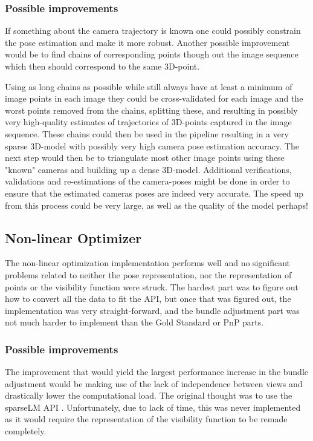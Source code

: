 \subsubsection{Possible improvements}
If something about the camera trajectory is known one could possibly constrain the pose estimation and make it more robust.
Another possible improvement would be to find chains of corresponding points though out the image sequence which then should correspond to the same 3D-point. 
\newpage

Using as long chains as possible while still always have at least a minimum of image points in each image they could be cross-validated for each image and the worst points removed from the chains, splitting these, and resulting in possibly very high-quality estimates of trajectories of 3D-points captured in the image sequence. These chains could then be used in the pipeline resulting in a very sparse 3D-model with possibly very high camera pose estimation accuracy. The next step would then be to triangulate most other image points using these "known" cameras and building up a dense 3D-model. Additional verifications, validations and re-estimations of the camera-poses might be done in order to ensure that the estimated cameras poses are indeed very accurate. The speed up from this process could be very large, as well as the quality of the model perhaps!

\subsection{Non-linear Optimizer}
The non-linear optimization implementation performs well and no significant problems related to neither the pose representation, nor the representation of points or the visibility function were struck. The hardest part was to figure out how to convert all the data to fit the API, but once that was figured out, the implementation was very straight-forward, and the bundle adjustment part was not much harder to implement than the Gold Standard or PnP parts.

\subsubsection{Possible improvements}
The improvement that would yield the largest performance increase in the bundle adjustment would be making use of the lack of independence between views and drastically lower the computational load. The original thought was to use the sparseLM API \cite{sparseLM}. Unfortunately, due to lack of time, this was never implemented as it would require the representation of the visibility function to be remade completely. 

